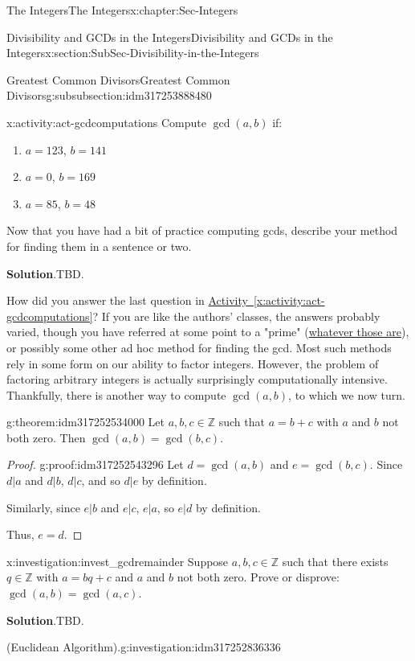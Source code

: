 \documentclass[oneside,10pt,]{book}
\newcommand{\blocktitlefont}{\relax}
\newcommand{\xreffont}{\relax}
\numberwithin{equation}{section}
\def\Z{{\mathbb Z}}
\begin{document}
\begin{chapterptx}{The Integers}{}{The Integers}{}{}{x:chapter:Sec-Integers}
\begin{sectionptx}{Divisibility and GCDs in the Integers}{}{Divisibility and GCDs in the Integers}{}{}{x:section:SubSec-Divisibility-in-the-Integers}
\begin{subsubsectionptx}{Greatest Common Divisors}{}{Greatest Common Divisors}{}{}{g:subsubsection:idm317253888480}
\begin{activity}{}{x:activity:act-gcdcomputations}%
Compute \(\gcd(a,b)\) if:%
\begin{enumerate}
\item{}\(a = 123\), \(b = 141\)%
\item{}\(a = 0\), \(b = 169\)%
\item{}\(a= 85\), \(b = 48\)%
\end{enumerate}
Now that you have had a bit of practice computing gcds, describe your method for finding them in a sentence or two.%
\par\smallskip%
\noindent\textbf{\blocktitlefont Solution}.\hypertarget{g:solution:idm317252489168}{}\quad{}TBD.%
\end{activity}
How did you answer the last question in \hyperref[x:activity:act-gcdcomputations]{Activity~{\xreffont\ref{x:activity:act-gcdcomputations}}}? If you are like the authors' classes, the answers probably varied, though you have referred at some point to a "prime" (\hyperref[x:definition:def-primeinteger]{whatever those are}), or possibly some other ad hoc method for finding the gcd. Most such methods rely in some form on our ability to factor integers. However, the problem of factoring arbitrary integers is actually surprisingly computationally intensive. Thankfully, there is another way to compute \(\gcd(a,b)\), to which we now turn.%
\begin{theorem}{}{}{g:theorem:idm317252534000}%
Let \(a,b,c\in\Z\) such that \(a = b+c\) with \(a\) and \(b\) not both zero. Then \(\gcd(a,b) = \gcd(b,c)\).%
\end{theorem}
\begin{proof}{}{g:proof:idm317252543296}
Let \(d = \gcd(a,b)\) and \(e = \gcd(b,c)\). Since \(d|a\) and \(d|b\), \(d|c\), and so \(d|e\) by definition.%
\par
Similarly, since \(e|b\) and \(e|c\), \(e|a\), so \(e|d\) by definition.%
\par
Thus, \(e = d\).%
\end{proof}
\begin{investigation}{}{x:investigation:invest_gcdremainder}%
Suppose \(a,b,c\in\Z\) such that there exists \(q\in\Z\) with \(a = bq + c\) and \(a\) and \(b\) not both zero. Prove or disprove: \(\gcd(a,b)=\gcd(a,c)\).%
\par\smallskip%
\noindent\textbf{\blocktitlefont Solution}.\hypertarget{g:solution:idm317252691856}{}\quad{}TBD.\end{investigation}
\begin{investigation}{(Euclidean Algorithm).}{g:investigation:idm317252836336}%

\end{investigation}
\end{subsubsectionptx}
\end{sectionptx}
\end{chapterptx}
\end{document}
